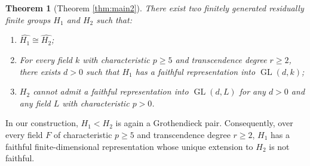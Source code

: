 \documentclass[11pt]{amsart}
\newtheorem{thm}{Theorem}[section]
\theoremstyle{definition}
\DeclareMathOperator{\GL}{GL}
\begin{document}
\begin{thm}[Theorem \ref{thm:main2}] \label{thm:intro-main2}
There exist two finitely generated residually finite groups $H_1$ and $H_2$ such that:
\begin{enumerate}[label=(\arabic*)]
  \item $\widehat{H_1} \cong \widehat{H_2}$;
  \item For every field $k$ with characteristic $p \geq 5$ and transcendence degree $r \geq 2$,
there exists $d>0$ such that $H_1$ has a faithful representation into $\GL(d,k)$;
  \item $H_2$ cannot admit a faithful representation into $\GL(d,L)$ for any $d>0$ and any field $L$ with characteristic $p > 0$.
\end{enumerate}
\end{thm}

 In our construction, $H_1<H_2$ is again a Grothendieck pair. 
 Consequently, over every field $F$ of characteristic $p \geq 5$ and transcendence degree $r \geq 2$, $H_1$ has a faithful finite-dimensional representation whose unique extension to $H_2$ is not faithful.
\end{document}
